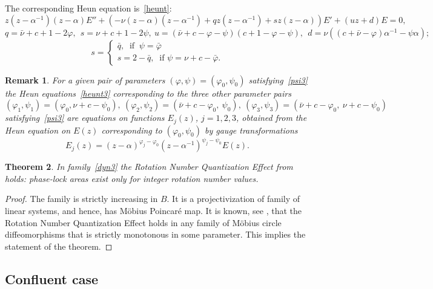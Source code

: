 \documentclass[preprint,12pt]{elsarticle}
\theoremstyle{plain}
\newtheorem{theorem}{Theorem}
\newtheorem{remark}[theorem]{Remark}
\renewcommand{\phi}{\varphi}
\def\a{\alpha}
\def\baml{\alpha^{-1}}
\numberwithin{equation}{section}
\numberwithin{equation}{section}
\begin{document}
The corresponding Heun equation is~\eqref{heunt}: 
\begin{equation}\label{heunt3}
    z(z-\baml)(z-\a)E''+(-\nu(z-\alpha)(z-\baml)+q z(z-\baml)+sz(z-\a))E'+(uz+d)E=0,
\end{equation}
    $$q=\bar\nu+c+1-2\phi, \ \ s=\nu+c+1-2\psi, \ u=(\bar\nu+c-\phi-\psi)(c+1-\phi-\psi), \ \ d=\nu((c+\bar\nu-\phi)\baml-\psi\a);$$
$$s=\begin{cases} \bar q, \ \text{ if } \ \psi=\bar\phi\\
s=2-\bar q, \ \text{ if } \psi=\nu+c-\bar\phi.\end{cases}$$
\begin{remark} For a given pair of parameters $(\phi,\psi)=(\phi_0,\psi_0)$ satisfying~\eqref{psi3} the Heun equations~\eqref{heunt3} corresponding to the three other parameter pairs 
    $$(\phi_1,\psi_1)=(\phi_0, \nu+c-\psi_0), \  (\phi_2,\psi_2)=(\bar\nu+c-\phi_0,\ \psi_0), \ 
(\phi_3,\psi_3)=(\bar\nu+c-\phi_0,\ \nu+c-\psi_0)$$
satisfying~\eqref{psi3} are equations on functions $E_j(z)$, $j=1,2,3$,  
obtained from the Heun equation on $E(z)$ corresponding to $(\phi_0,\psi_0)$ by 
gauge transformations 
    $$E_j(z)=(z-\a)^{\phi_j-\phi_0}(z-\baml)^{\psi_j-\psi_0}E(z).$$
\end{remark}

\begin{theorem} In family~\eqref{dyn3} the Rotation Number Quantization Effect from \cite{buchstaber2010rotation} holds: phase-lock areas exist only for integer rotation number values. 
\end{theorem}

\begin{proof} The family is strictly increasing in $B$. It is a projectivization of family of linear systems, and 
hence, has M\"obius Poincar\'e map. It is known, see \cite{buchstaber2010rotation}, that the Rotation Number Quantization Effect holds in any family of M\"obius circle diffeomorphisms that is  strictly monotonous in some parameter. This implies the statement of the theorem. 
\end{proof}
  
 
 
\subsection{Confluent case}\label{subsec:confl-case}
\end{document}
